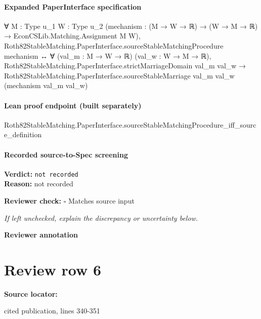 \documentclass[10pt]{article}
\newcommand{\reviewerbox}{%
  \par\noindent\fbox{\parbox{0.96\linewidth}{\rule{0pt}{0.38in}}}\par
}
\newcommand{\reviewmatch}[1]{%
  \par\noindent\textbf{Reviewer check:} $\square$\; #1\par
  \noindent\emph{If left unchecked, explain the discrepancy or uncertainty below.}\par
}
\begin{document}
\paragraph{Expanded PaperInterface specification}
\begin{ReviewVerbatim}
∀ {M : Type u_1} {W : Type u_2} (mechanism : (M → W → ℝ) → (W → M → ℝ) → EconCSLib.Matching.Assignment M W),
  Roth82StableMatching.PaperInterface.sourceStableMatchingProcedure mechanism ↔
    ∀ (val_m : M → W → ℝ) (val_w : W → M → ℝ),
      Roth82StableMatching.PaperInterface.strictMarriageDomain val_m val_w →
        Roth82StableMatching.PaperInterface.sourceStableMarriage val_m val_w (mechanism val_m val_w)
\end{ReviewVerbatim}

\paragraph{Lean proof endpoint (built separately)}\begin{ReviewVerbatim}
Roth82StableMatching.PaperInterface.sourceStableMatchingProcedure_iff_source_definition
\end{ReviewVerbatim}

\paragraph{Recorded source-to-Spec screening}
\textbf{Verdict:} \texttt{not recorded}
\\
\textbf{Reason:} not recorded
\reviewmatch{Matches source input}
\noindent\textbf{Reviewer annotation}\par
\reviewerbox
\clearpage
\hypertarget{source-claim-238b1f865cc8464c}{}
\section*{Review row 6}
\textbf{Source locator:} {\footnotesize\raggedright cited publication, lines 340-\allowbreak{}351\par}
\end{document}
